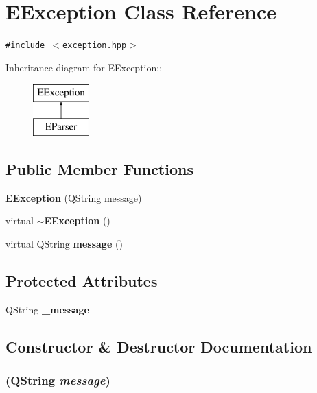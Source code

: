 \section{EException Class Reference}
\label{classEException}
{\tt \#include $<$exception.hpp$>$}

Inheritance diagram for EException::\begin{figure}[H]
\begin{center}
\leavevmode
\includegraphics[height=2cm]{classEException}
\end{center}
\end{figure}
\subsection*{Public Member Functions}
\begin{CompactItemize}
\item 
{\bf EException} (QString message)
\item 
virtual {\bf $\sim$EException} ()
\item 
virtual QString {\bf message} ()
\end{CompactItemize}
\subsection*{Protected Attributes}
\begin{CompactItemize}
\item 
QString {\bf \_\-message}
\end{CompactItemize}


\subsection{Constructor \& Destructor Documentation}
\subsubsection{ (QString {\em message})\hspace{0.3cm}{\tt  [inline]}}\label{classEException_a0}


